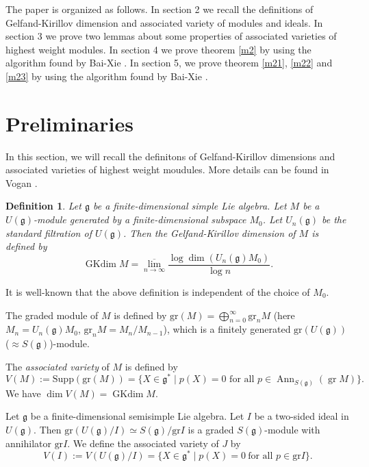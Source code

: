 \documentclass{amsart}[12pt]
\newtheorem{definition}{Definition}[section]
\newcommand{\gkd}{\operatorname{GKdim}}
\numberwithin{equation}{section}
\begin{document}
The paper is organized as follows. In section 2 we recall the definitions of Gelfand-Kirillov dimension and associated variety of modules and ideals. In section 3 we prove two lemmas about some properties of associated varieties of highest weight modules.
In section 4 we prove theorem \ref{m2} by using the algorithm found by Bai-Xie \cite{BX}.
In section 5, we prove theorem \ref{m21}, \ref{m22} and \ref{m23} by using the algorithm found by Bai-Xie \cite{BX-2}.



\section{Preliminaries}

In this section, we will recall the definitons of Gelfand-Kirillov dimensions and associated varieties of highest weight moudules. More details can be found in Vogan \cite{Vo78}.

\begin{definition} Let $\mathfrak{g}$ be a finite-dimensional simple Lie algebra. Let $M$ be a $U(\mathfrak{g})$-module generated by a finite-dimensional subspace $M_0$. Let $U_{n}(\mathfrak{g})$ be the standard filtration of $U(\mathfrak{g})$.  Then the \textit{Gelfand-Kirillov dimension} of $M$  is defined by$$
	\operatorname{GKdim} M = \overline{\lim\limits_{n\rightarrow \infty}}\frac{\log\dim( U_n(\mathfrak{g})M_{0} )}{\log n}.
	$$
\end{definition}
It is well-known that the above definition  is independent of  the choice of  $M_0$.

The graded module of $M$ is defined by $\text{gr} (M)=\bigoplus\limits_{n=0}^{\infty} \text{gr}_n M$ (here $M_n=U_n(\mathfrak{g})M_0$, $\text{gr}_n M=M_n/{M_{n-1}}$), which is a finitely generated $\text{gr}(U(\mathfrak{g}))$($\approx S(\mathfrak{g})$)-module.

The  \textit{ associated variety} of $M$ is defined by
$$
V(M):=\text{Supp}(\text{gr} (M))=\{X\in \mathfrak{g}^* \mid p(X)=0 \text{ for all~} p\in \operatorname{Ann}_{S(\mathfrak{g})}(\operatorname{gr} M)\}.
$$
We have $\dim V(M)=\gkd M$.


Let $\mathfrak{g}$ be a finite-dimensional semisimple Lie algebra. Let $I$ be a two-sided ideal in $U(\mathfrak{g})$. Then $\text{gr}(U(\mathfrak{g})/I)\simeq S(\mathfrak{g})/\text{gr}I$ is a graded $S(\mathfrak{g})$-module with annihilator $\text{gr}I$. We define the associated variety of $J$ by
$$V(I):=V(U(\mathfrak{g})/I)=\{X\in \mathfrak{g}^* \mid p(X)=0\ \mbox{for all $p \in {\text{gr}}I$}\}.
$$
\end{document}
